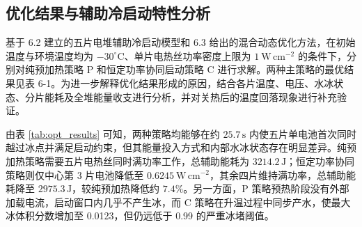 \documentclass[bwprint]{gmcmthesis}
\numberwithin{figure}{section}
\begin{document}
\subsection{优化结果与辅助冷启动特性分析}

基于 6.2 建立的五片电堆辅助冷启动模型和 6.3 给出的混合动态优化方法，在初始温度与环境温度均为 \(-30^\circ\mathrm C\)、单片电热丝功率密度上限为 \(1\ \mathrm{W\,cm^{-2}}\) 的条件下，分别对纯预加热策略 P 和恒定功率协同启动策略 C 进行求解。两种主策略的最优结果见表 6-1。为进一步解释优化结果形成的原因，结合各片温度、电压、水冰状态、分片能耗及全堆能量收支进行分析，并对关热后的温度回落现象进行补充验证。

\begin{table}[htbp]
    \centering
    \caption{两种辅助冷启动策略的优化结果} %
    \vspace{0.3cm}
    \label{tab:opt_results} %
    \renewcommand{\arraystretch}{1.5} %
\end{table}

由表 \ref{tab:opt_results} 可知，两种策略均能够在约 \(25.7\,\mathrm s\) 内使五片单电池首次同时越过冰点并满足启动约束，但其能量投入方式和内部水冰状态存在明显差异。纯预加热策略需要五片电热丝同时满功率工作，总辅助能耗为 \(3214.2\,\mathrm J\)；恒定功率协同策略则仅中心第 3 片电池降低至 \(0.6245\ \mathrm{W\,cm^{-2}}\)，其余四片维持满功率，总辅助能耗降至 \(2975.3\,\mathrm J\)，较纯预加热降低约 \(7.4\%\)。另一方面，P 策略预热阶段没有外部加载电流，启动窗口内几乎不产生冰，而 C 策略在升温过程中同步产水，使最大冰体积分数增加至 0.0123，但仍远低于 0.99 的严重冰堵阈值。
\end{document}
